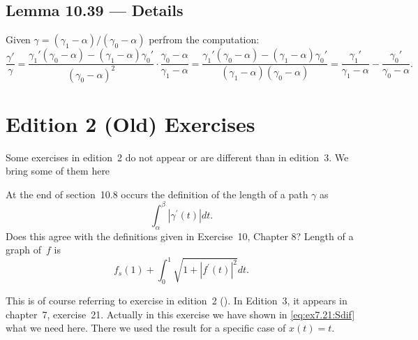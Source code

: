 \subsection{Lemma 10.39 --- Details}

Given \(\gamma = (\gamma_1 - \alpha) / (\gamma_0 - \alpha)\)
perfrom the computation:
\begin{equation*}
\frac{\gamma'}{\gamma}
= \frac{\gamma_1'(\gamma_0-\alpha) - (\gamma_1-\alpha)\gamma_0'}{
               (\gamma_0 - \alpha)^2}
   \cdot \frac{\gamma_0 - \alpha}{\gamma_1 - \alpha}
= \frac{\gamma_1'(\gamma_0-\alpha) - (\gamma_1-\alpha)\gamma_0'}{
               (\gamma_1 - \alpha)(\gamma_0 - \alpha)}
= \frac{\gamma_1'}{\gamma_1-\alpha} - \frac{\gamma_0'}{\gamma_0-\alpha}.
\end{equation*}

\section{Edition 2 (Old) Exercises} %

Some exercises in edition~2 do not appear or are different than in edition~3.
We bring some of them here

\begin{enumerate}

\iffalse
\begin{excopy}
   If $A$ and $B$ are disjoint subsets of the plane, if $A$ is compact,
   and if $B$ is closed, then there exists
   a~\(\delta > 0\) such that \(|\alpha-\beta| \geq 0\) for all
   \(\alpha \in A\) and \(\beta \in B\). Prove this with an arbitrary
   metric space in place of the plane.
\end{excopy}
  Let $d$ be the metric. Define
  \[G_n = \{x \in A: d(x,B) > 1/n\}\]
  for all \(n>0\). It is clear that for all \(x\in A\) \(d(x,B)>0\)
  and so \(\cup G_n = A\). Since A is compact there exists $m$ such that
  \(\cup_{n=1}^m G_n = A\).
  Hence, for all \(x\in A\) \(d(x,B)>1/m\)
  Put \(\delta=1/m\) that satsify the requirement.
\fi

\setcounter{enumi}{1}
\begin{excopy}
    At the end of section~10.8 occurs the definition of the length of a path
    \(\gamma\) as
    \[\int_\alpha^\beta|{\gamma^\prime}(t)|dt.\]
    Does this agree with the definitions given in Exercise~10, Chapter 8?
    Length of a graph of~$f$ is
       \[f_s(1) + \int_0^1 \sqrt{1 + |f^\prime(t)|^2}dt.\]
\end{excopy}

 This is of course referring to exercise in
edition~2 (\cite{RudinRCA80}).
In Edition~3, it appears in chapter~7, exercise~21.
Actually in this exercise we have shown in \eqref{eq:ex7.21:Sdif}
what we need here. There we used the result for a specific case
of \(x(t)=t\).

\end{enumerate}


